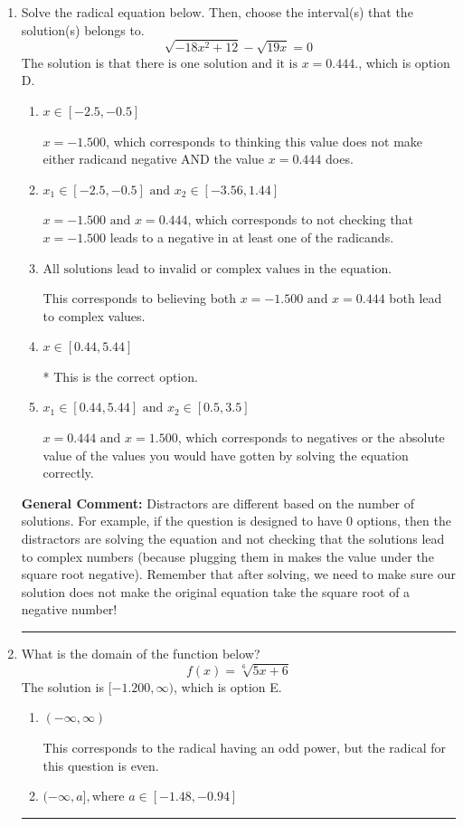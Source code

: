 \documentclass{extbook}[14pt]
\newcommand{\litem}[1]{\item #1

\rule{\textwidth}{0.4pt}}
\begin{document}
\begin{enumerate}\litem{
Solve the radical equation below. Then, choose the interval(s) that the solution(s) belongs to.
\[ \sqrt{-18 x^2 + 12} - \sqrt{19 x} = 0 \]The solution is \( \text{that there is one solution and it is } x = 0.444. \), which is option D.\begin{enumerate}[label=\Alph*.]
\item \( x \in [-2.5,-0.5] \)

$x = -1.500$, which corresponds to thinking this value does not make either radicand negative AND the value $x = 0.444$ does.
\item \( x_1 \in [-2.5, -0.5] \text{ and } x_2 \in [-3.56,1.44] \)

$x = -1.500 \text{ and } x = 0.444$, which corresponds to not checking that $x = -1.500$ leads to a negative in at least one of the radicands.
\item \( \text{All solutions lead to invalid or complex values in the equation.} \)

This corresponds to believing both $x = -1.500 \text{ and } x = 0.444$ both lead to complex values.
\item \( x \in [0.44,5.44] \)

* This is the correct option.
\item \( x_1 \in [0.44, 5.44] \text{ and } x_2 \in [0.5,3.5] \)

$x = 0.444 \text{ and } x = 1.500$, which corresponds to negatives or the absolute value of the values you would have gotten by solving the equation correctly.
\end{enumerate}

\textbf{General Comment:} Distractors are different based on the number of solutions. For example, if the question is designed to have 0 options, then the distractors are solving the equation and not checking that the solutions lead to complex numbers (because plugging them in makes the value under the square root negative). Remember that after solving, we need to make sure our solution does not make the original equation take the square root of a negative number!
}
\litem{
What is the domain of the function below?
\[ f(x) = \sqrt[6]{5 x + 6} \]The solution is \( [-1.200, \infty) \), which is option E.\begin{enumerate}[label=\Alph*.]
\item \( (-\infty, \infty) \)

This corresponds to the radical having an odd power, but the radical for this question is even.
\item \( (-\infty, a], \text{where } a \in [-1.48, -0.94] \)


\end{enumerate}}
\end{enumerate}
\end{document}
